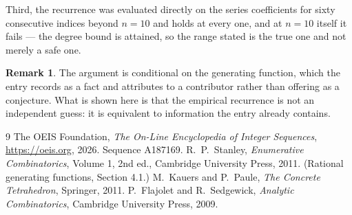 \documentclass[11pt,a4paper]{article}
\theoremstyle{plain}
\theoremstyle{definition}
\newtheorem{remark}[theorem]{Remark}
\begin{document}
Third, the recurrence was evaluated directly on the series coefficients for sixty consecutive
indices beyond $n=10$ and holds at every one, and at $n=10$ itself it fails --- the
degree bound is attained, so the range stated is the true one and not merely a safe one.

\begin{remark}
The argument is conditional on the generating function, which the entry records as a fact and
attributes to a contributor rather than offering as a conjecture. What is shown here is that
the empirical recurrence is not an independent guess: it is equivalent to information the
entry already contains.
\end{remark}

\begin{thebibliography}{9}
 The OEIS Foundation, \emph{The On-Line Encyclopedia of Integer
Sequences}, \url{https://oeis.org}, 2026. Sequence A187169.
 R.~P.~Stanley, \emph{Enumerative Combinatorics}, Volume 1, 2nd ed.,
Cambridge University Press, 2011. (Rational generating functions, Section 4.1.)
 M.~Kauers and P.~Paule, \emph{The Concrete Tetrahedron}, Springer, 2011.
 P.~Flajolet and R.~Sedgewick, \emph{Analytic Combinatorics}, Cambridge
University Press, 2009.
\end{thebibliography}
\end{document}
